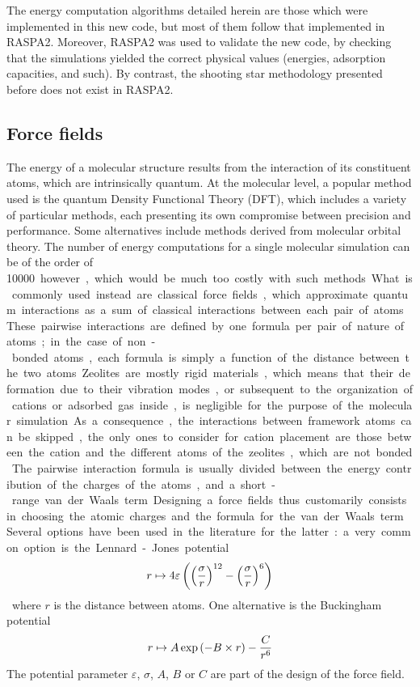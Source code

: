 \documentclass[main.tex]{subfiles}
\begin{document}
The energy computation algorithms detailed herein are those which were implemented in this new code, but most of them follow that implemented in RASPA2. Moreover, RASPA2 was used to validate the new code, by checking that the simulations yielded the correct physical values (energies, adsorption capacities, and such). By contrast, the shooting star methodology presented before does not exist in RASPA2.

\subsection{Force fields}

The energy of a molecular structure results from the interaction of its constituent atoms, which are intrinsically quantum. At the molecular level, a popular method used is the quantum Density Functional Theory (DFT), which includes a variety of particular methods, each presenting its own compromise between precision and performance. Some alternatives include methods derived from molecular orbital theory. The number of energy computations for a single molecular simulation can be of the order of \qty{10000} however, which would be much too costly with such methods.

What is commonly used instead are classical force fields, which approximate quantum interactions as a sum of classical interactions between each pair of atoms. These pairwise interactions are defined by one formula per pair of nature of atoms; in the case of non-bonded atoms, each formula is simply a function of the distance between the two atoms. Zeolites are mostly rigid materials, which means that their deformation due to their vibration modes, or subsequent to the organization of cations or adsorbed gas inside, is negligible for the purpose of the molecular simulation. As a consequence, the interactions between framework atoms can be skipped, the only ones to consider for cation placement are those between the cation and the different atoms of the zeolites, which are not bonded.

The pairwise interaction formula is usually divided between the energy contribution of the charges of the atoms, and a short-range van der Waals term. Designing a force fields thus customarily consists in choosing the atomic charges and the formula for the van der Waals term. Several options have been used in the literature for the latter: a very common option is the Lennard-Jones potential
\[r\mapsto 4\varepsilon\left(\left(\frac \sigma r\right)^{12} - \left(\frac \sigma r\right)^6\right)\]
where $r$ is the distance between atoms. One alternative is the Buckingham potential
\[r\mapsto A\exp\left(-B\times r\right) - \frac C{r^6}\]
The potential parameter $\varepsilon$, $\sigma$, $A$, $B$ or $C$ are part of the design of the force field.
\end{document}

